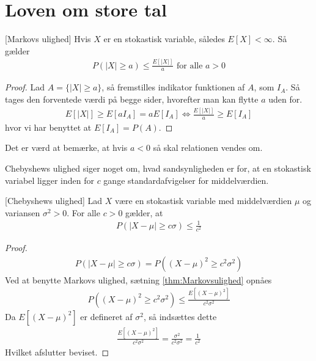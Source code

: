 \section{Loven om store tal}
\begin{theorem} \label{thm:Markovsulighed}[Markovs ulighed]
Hvis $X$ er en stokastisk variable, således
$E[X] < \infty$. Så gælder
\begin{align*}
    P(|X|\geq a) \leq \frac{E[|X|]}{a} \text{ for alle } a > 0
\end{align*}
\end{theorem}
\begin{proof}
Lad $A=\{|X|\geq a\}$, så fremstilles indikator funktionen af $A$, som $I_A$. Så tages den forventede værdi på begge sider, hvorefter man kan flytte $a$ uden for.
\begin{align*}
E[|X|]\geq E[aI_A] = a E[I_A] \iff \frac{E[|X|]}{a}\geq E[I_A]
\end{align*}
hvor vi har benyttet at $E[I_A] = P(A)$.
\end{proof}
Det er værd at bemærke, at hvis $a<0$ så skal relationen vendes om.

Chebyshews ulighed siger noget om, hvad sandsynligheden er for, at en stokastisk variabel ligger inden for $c$ gange standardafvigelser for middelværdien.
\begin{theorem} \label{Thm:Chebyshewsulighed}[Chebyshews ulighed]
    Lad $X$ være en stokastisk variable med middelværdien $\mu$ og variansen $\sigma^2>0$. For alle $c>0$ gælder, at
    \begin{align*}
        P(|X-\mu|\geq c \sigma)\leq \frac{1}{c^2}
    \end{align*}
\end{theorem}
\begin{proof}%
    \begin{align*}
        P(|X-\mu|\geq c \sigma)=P((X-\mu)^2\geq c^2\sigma^2)
    \end{align*}
Ved at benytte Markovs ulighed, sætning \ref{thm:Markovsulighed} opnåes
\begin{align*}
    P((X-\mu)^2\geq c^2\sigma^2) \leq \frac{E[(X-\mu)^2]}{c^2\sigma^2}
\end{align*}
Da $E[(X-\mu)^2]$ er defineret af $\sigma^2$, så indsættes dette
\begin{align*}
    \frac{E[(X-\mu)^2]}{c^2\sigma^2} = \frac{\sigma^2}{c^2\sigma^2} = \frac{1}{c^2}
\end{align*}
Hvilket afslutter beviset.
\end{proof}

